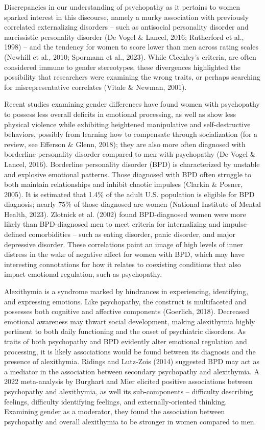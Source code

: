 \documentclass[
  man,floatsintext]{apa7}
\begin{document}
Discrepancies in our understanding of psychopathy as it pertains to women sparked interest in this discourse, namely a murky association with previously correlated externalizing disorders -- such as antisocial personality disorder and narcissistic personality disorder (De Vogel \& Lancel, 2016; Rutherford et al., 1998) -- and the tendency for women to score lower than men across rating scales (Newhill et al., 2010; Spormann et al., 2023). While Cleckley's criteria, are often considered immune to gender stereotypes, these divergences highlighted the possibility that researchers were examining the wrong traits, or perhaps searching for misrepresentative correlates (Vitale \& Newman, 2001).

Recent studies examining gender differences have found women with psychopathy to possess less overall deficits in emotional processing, as well as show less physical violence while exhibiting heightened manipulative and self-destructive behaviors, possibly from learning how to compensate through socialization (for a review, see Efferson \& Glenn, 2018); they are also more often diagnosed with borderline personality disorder compared to men with psychopathy (De Vogel \& Lancel, 2016). Borderline personality disorder (BPD) is characterized by unstable and explosive emotional patterns. Those diagnosed with BPD often struggle to both maintain relationships and inhibit chaotic impulses (Clarkin \& Posner, 2005). It is estimated that 1.4\% of the adult U.S. population is eligible for BPD diagnosis; nearly 75\% of those diagnosed are women (National Institute of Mental Health, 2023). Zlotnick et al. (2002) found BPD-diagnosed women were more likely than BPD-diagnosed men to meet criteria for internalizing and impulse-defined comorbidities -- such as eating disorder, panic disorder, and major depressive disorder. These correlations paint an image of high levels of inner distress in the wake of negative affect for women with BPD, which may have interesting connotations for how it relates to coexisting conditions that also impact emotional regulation, such as psychopathy.

Alexithymia is a syndrome marked by hindrances in experiencing, identifying, and expressing emotions. Like psychopathy, the construct is multifaceted and possesses both cognitive and affective components (Goerlich, 2018). Decreased emotional awareness may thwart social development, making alexithymia highly pertinent to both daily functioning and the onset of psychiatric disorders. As traits of both psychopathy and BPD evidently alter emotional regulation and processing, it is likely associations would be found between its diagnosis and the presence of alexithymia. Ridings and Lutz-Zois (2014) suggested BPD may act as a mediator in the association between secondary psychopathy and alexithymia. A 2022 meta-analysis by Burghart and Mier elicited positive associations between psychopathy and alexithymia, as well its sub-components -- difficulty describing feelings, difficulty identifying feelings, and externally-oriented thinking. Examining gender as a moderator, they found the association between psychopathy and overall alexithymia to be stronger in women compared to men.
\end{document}

